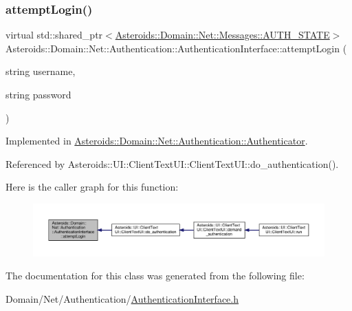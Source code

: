 \subsubsection{\texorpdfstring{attempt\+Login()}{attemptLogin()}}
{\footnotesize\ttfamily virtual std\+::shared\+\_\+ptr$<$\hyperlink{classAsteroids_1_1Domain_1_1Net_1_1Messages_1_1AUTH__STATE}{Asteroids\+::\+Domain\+::\+Net\+::\+Messages\+::\+A\+U\+T\+H\+\_\+\+S\+T\+A\+TE}$>$ Asteroids\+::\+Domain\+::\+Net\+::\+Authentication\+::\+Authentication\+Interface\+::attempt\+Login (\begin{DoxyParamCaption}\item[{string}]{username,  }\item[{string}]{password }\end{DoxyParamCaption})\hspace{0.3cm}{\ttfamily [pure virtual]}}



Implemented in \hyperlink{classAsteroids_1_1Domain_1_1Net_1_1Authentication_1_1Authenticator_a1dd2c0964bae0658b8477c7d041f62d5}{Asteroids\+::\+Domain\+::\+Net\+::\+Authentication\+::\+Authenticator}.



Referenced by Asteroids\+::\+U\+I\+::\+Client\+Text\+U\+I\+::\+Client\+Text\+U\+I\+::do\+\_\+authentication().

Here is the caller graph for this function\+:\nopagebreak
\begin{figure}[H]
\begin{center}
\leavevmode
\includegraphics[width=350pt]{classAsteroids_1_1Domain_1_1Net_1_1Authentication_1_1AuthenticationInterface_a2358abf451a5aa6df9d29e9dfda2898c_icgraph}
\end{center}
\end{figure}


The documentation for this class was generated from the following file\+:\begin{DoxyCompactItemize}
\item 
Domain/\+Net/\+Authentication/\hyperlink{AuthenticationInterface_8h}{Authentication\+Interface.\+h}\end{DoxyCompactItemize}
